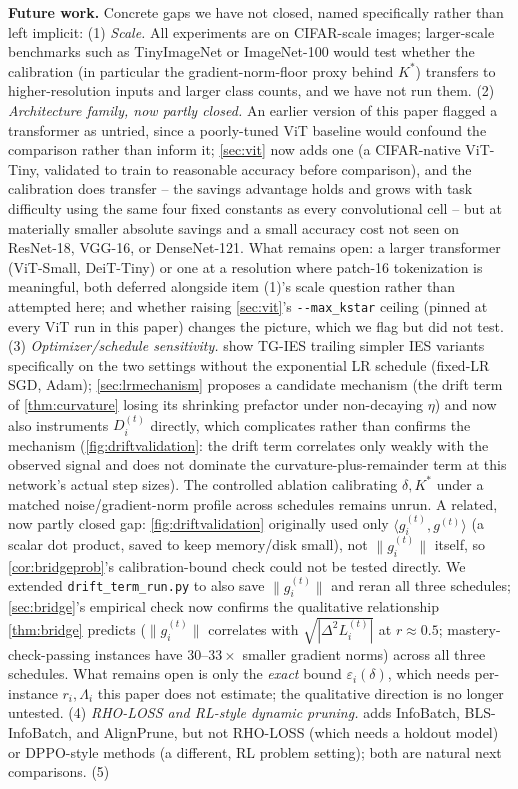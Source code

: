 \documentclass{article}
\theoremstyle{plain}
\theoremstyle{definition}
\theoremstyle{remark}
\begin{document}
\textbf{Future work.} Concrete gaps we have not closed, named specifically rather than left implicit: (1) \emph{Scale.} All experiments are on CIFAR-scale images; larger-scale benchmarks such as TinyImageNet or ImageNet-100 would test whether the calibration (in particular the gradient-norm-floor proxy behind $K^*$) transfers to higher-resolution inputs and larger class counts, and we have not run them. (2) \emph{Architecture family, now partly closed.} An earlier version of this paper flagged a transformer as untried, since a poorly-tuned ViT baseline would confound the comparison rather than inform it; \cref{sec:vit} now adds one (a CIFAR-native ViT-Tiny, validated to train to reasonable accuracy before comparison), and the calibration does transfer -- the savings advantage holds and grows with task difficulty using the same four fixed constants as every convolutional cell -- but at materially smaller absolute savings and a small accuracy cost not seen on ResNet-18, VGG-16, or DenseNet-121. What remains open: a larger transformer (ViT-Small, DeiT-Tiny) or one at a resolution where patch-16 tokenization is meaningful, both deferred alongside item (1)'s scale question rather than attempted here; and whether raising \cref{sec:vit}'s \texttt{-{}-max\_kstar} ceiling (pinned at every ViT run in this paper) changes the picture, which we flag but did not test. (3) \emph{Optimizer/schedule sensitivity.}  show TG-IES trailing simpler IES variants specifically on the two settings without the exponential LR schedule (fixed-LR SGD, Adam); \cref{sec:lrmechanism} proposes a candidate mechanism (the drift term of \cref{thm:curvature} losing its shrinking prefactor under non-decaying $\eta$) and now also instruments $D_i^{(t)}$ directly, which complicates rather than confirms the mechanism (\cref{fig:driftvalidation}: the drift term correlates only weakly with the observed signal and does not dominate the curvature-plus-remainder term at this network's actual step sizes). The controlled ablation calibrating $\delta,K^*$ under a matched noise/gradient-norm profile across schedules remains unrun. A related, now partly closed gap: \cref{fig:driftvalidation} originally used only $\langle g_i^{(t)},g^{(t)}\rangle$ (a scalar dot product, saved to keep memory/disk small), not $\|g_i^{(t)}\|$ itself, so \cref{cor:bridgeprob}'s calibration-bound check could not be tested directly. We extended \texttt{drift\_term\_run.py} to also save $\|g_i^{(t)}\|$ and reran all three schedules; \cref{sec:bridge}'s empirical check now confirms the qualitative relationship \cref{thm:bridge} predicts ($\|g_i^{(t)}\|$ correlates with $\sqrt{|\Delta^2L_i^{(t)}|}$ at $r{\approx}0.5$; mastery-check-passing instances have $30$--$33\times$ smaller gradient norms) across all three schedules. What remains open is only the \emph{exact} bound $\varepsilon_i(\delta)$, which needs per-instance $r_i,\Lambda_i$ this paper does not estimate; the qualitative direction is no longer untested. (4) \emph{RHO-LOSS and RL-style dynamic pruning.}  adds InfoBatch, BLS-InfoBatch, and AlignPrune, but not RHO-LOSS \citep{mindermann2022prioritized} (which needs a holdout model) or DPPO-style methods \citep{zhu2026dppo} (a different, RL problem setting); both are natural next comparisons. (5) 
\end{document}
